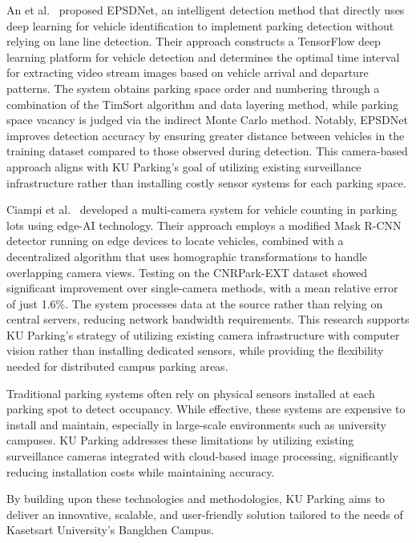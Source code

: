 An et al.~\cite{an2022epsdnet} proposed EPSDNet, an intelligent detection method that directly uses deep learning 
for vehicle identification to implement parking detection without relying on lane line detection.
 Their approach constructs a TensorFlow deep learning platform for vehicle detection and determines the optimal time interval for 
 extracting video stream images based on vehicle arrival and departure patterns. 
 The system obtains parking space order and numbering through a combination of the TimSort algorithm and data layering method, 
 while parking space vacancy is judged via the indirect Monte Carlo method. Notably, 
 EPSDNet improves detection accuracy by ensuring greater distance between vehicles in the training dataset compared to those observed during detection. 
 This camera-based approach aligns with KU Parking's goal of utilizing existing surveillance infrastructure rather than installing costly sensor systems for each parking space.

Ciampi et al.~\cite{ciampi2022multicamera} developed a multi-camera system for vehicle counting in parking lots using edge-AI technology. 
Their approach employs a modified Mask R-CNN detector running on edge devices to locate vehicles, combined with a decentralized algorithm that uses homographic transformations to handle overlapping camera views. 
Testing on the CNRPark-EXT dataset showed significant improvement over single-camera methods, with a mean relative error of just 1.6\%. 
The system processes data at the source rather than relying on central servers, reducing network bandwidth requirements. 
This research supports KU Parking's strategy of utilizing existing camera infrastructure with computer vision rather than installing dedicated sensors, 
while providing the flexibility needed for distributed campus parking areas.

Traditional parking systems often rely on physical sensors installed at each parking spot to detect occupancy. 
While effective, these systems are expensive to install and maintain, especially in large-scale environments such as university campuses. 
KU Parking addresses these limitations by utilizing existing surveillance cameras integrated with cloud-based image processing, 
significantly reducing installation costs while maintaining accuracy.

By building upon these technologies and methodologies, KU Parking aims to deliver an innovative, scalable, and user-friendly solution tailored to the needs of Kasetsart University's Bangkhen Campus.